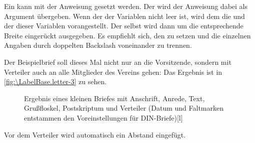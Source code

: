 \begin{Declaration}
\end{Declaration}
Ein  kann mit der Anweisung 
gesetzt werden. %
\iftrue%
Der  wird der Anweisung dabei als Argument übergeben. %
\fi%
Wenn der  der Variablen
 nicht leer ist, wird dem
 die  und der  dieser
Variablen vorangestellt. Der  selbst wird dann um die
entsprechende Breite eingerückt ausgegeben. Es empfiehlt
sich, den   zu
setzen und die einzelnen Angaben durch doppelten Backslash voneinander zu
trennen.
\begin{Example}
  Der Beispielbrief soll dieses Mal nicht nur an die Vorsitzende, sondern mit
  Verteiler auch an alle Mitglieder des Vereins gehen:
  \iftrue %
  Das Ergebnis ist in \autoref{fig:\LabelBase.letter-3} zu sehen.%
  \fi%
  \begin{figure}
    \setcapindent{0pt}%
    \begin{captionbeside}{Ergebnis eines
        kleinen Briefes mit Anschrift, Anrede, Text, Grußfloskel, Postskriptum
        und Verteiler (Datum und Faltmarken entstammen den Voreinstellungen
        für DIN-Briefe)}[l]
    \end{captionbeside}
    \label{fig:\LabelBase.letter-3}
  \end{figure}
\end{Example}
\iftrue%
Vor dem Verteiler wird automatisch ein Abstand eingefügt.%
\else%
Wie in \autoref{fig:\LabelBase.letter-3} zu sehen, wird vor dem Verteiler
automatisch ein Abstand eingefügt.%
\fi%
%
\EndIndexGroup


